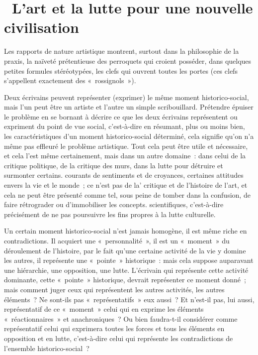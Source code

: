 \documentclass[french,twoside]{book} %
\begin{document}
\section[{ L'art et la lutte pour une nouvelle civilisation}]{ L'art et la lutte pour une nouvelle civilisation}
\noindent Les rapports de nature artistique montrent, surtout dans la philosophie de la praxis, la naïveté prétentieuse des perroquets qui croient posséder, dans quelques petites formules stéréotypées, les clefs qui ouvrent toutes les portes (ces clefs s’appellent exactement des « rossignols »).\par
Deux écrivains peuvent représenter (exprimer) le même moment historico-social, mais l’un peut être un artiste et l’autre un simple scribouillard. Prétendre épuiser le problème en se bornant à décrire ce que les deux écrivains représentent ou expriment du point de vue social, c’est-à-dire en résumant, plus ou moins bien, les caractéristiques d’un moment historico-social déterminé, cela signifie qu’on n’a même pas effleuré le problème artistique. Tout cela peut être utile et nécessaire, et cela l’est même certainement, mais dans un autre domaine : dans celui de la critique politique, de la critique des murs, dans la lutte pour détruire et surmonter certains. courants de sentiments et de croyances, certaines attitudes envers la vie et le monde ; ce n’est pas de la' critique et de l’histoire de l’art, et cela ne peut être présenté comme tel, sous peine de tomber dans la confusion, de faire rétrograder ou d’immobiliser les concepts. scientifiques, c’est-à-dire précisément de ne pas poursuivre les fins propres à la lutte culturelle.\par
Un certain moment historico-social n’est jamais homogène, il est même riche en contradictions. Il acquiert une « personnalité », il est un « moment » du déroulement de l’histoire, par le fait qu’une certaine activité de la vie y domine les autres, il représente une « pointe » historique : mais cela suppose auparavant une hiérarchie, une opposition, une lutte. L'écrivain qui représente cette activité dominante, cette « pointe » historique, devrait représenter ce moment donné ; mais comment juger ceux qui représentent les autres activités, les autres éléments ? Ne sont-ils pas « représentatifs » eux aussi ? Et n’est-il pas, lui aussi, représentatif de ce « moment » celui qui en exprime les éléments « réactionnaires » et anachroniques ? Ou bien faudra-t-il considérer comme représentatif celui qui exprimera toutes les forces et tous les éléments en opposition et en lutte, c’est-à-dire celui qui représente les contradictions de l’ensemble historico-social ?\par
\end{document}
